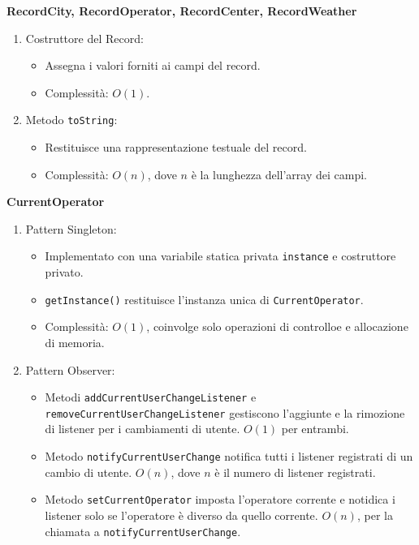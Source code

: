 \textbf{RecordCity, RecordOperator, RecordCenter, RecordWeather}
\begin{enumerate}
    \item Costruttore del Record:
    \begin{itemize}
        \item Assegna i valori forniti ai campi del record.
        \item Complessità: $O(1)$.
    \end{itemize}
    \item Metodo \texttt{toString}: 
    \begin{itemize}
        \item Restituisce una rappresentazione testuale del record.
        \item Complessità: $O(n)$, dove $n$ è la lunghezza dell'array dei campi.
    \end{itemize}
\end{enumerate}

\textbf{CurrentOperator}
\begin{enumerate}
    \item Pattern Singleton:
    \begin{itemize}
        \item Implementato con una variabile statica privata \texttt{instance} e costruttore privato.
        \item \texttt{getInstance()} restituisce l'instanza unica di \texttt{CurrentOperator}.
        \item Complessità: $O(1)$, coinvolge solo operazioni di controlloe e allocazione di memoria.
    \end{itemize}
    \item Pattern Observer:
    \begin{itemize}
        \item Metodi \texttt{addCurrentUserChangeListener} e \texttt{removeCurrentUserChangeListener} gestiscono l'aggiunte e la rimozione di listener per i cambiamenti di utente.
        $O(1)$ per entrambi.
        \item Metodo \texttt{notifyCurrentUserChange} notifica tutti i listener registrati di un cambio di utente.
        $O(n)$, dove $n$ è il numero di listener registrati.
        \item Metodo \texttt{setCurrentOperator} imposta l'operatore corrente e notidica i listener solo se l'operatore è diverso da quello corrente.
        $O(n)$, per la chiamata a \texttt{notifyCurrentUserChange}.
    \end{itemize}
\end{enumerate}